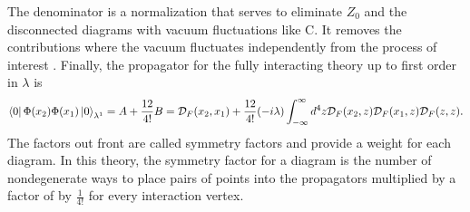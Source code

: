 \documentclass[12pt]{article}
\begin{document}
The denominator is a normalization that serves to eliminate $Z_0$ and the disconnected diagrams with vacuum fluctuations like C. It removes the contributions where the vacuum fluctuates independently from the process of interest \cite{peskin}. Finally, the propagator for the fully interacting theory up to first order in $\lambda$ is 
\begin{equation}
\bra{0}\Phi(x_2)\Phi(x_1)\ket{0}_{\lambda^1} = A + \frac{12}{4!}B = \mathcal{D}_F(x_2,x_1) + 
\frac{12}{4!}(-i\lambda)\int_{-\infty}^{\infty} d^4z \mathcal{D}_F(x_2,z) \mathcal{D}_F(x_1,z) \mathcal{D}_F(z,z).
\end{equation}
The factors out front are called symmetry factors and provide a weight for each diagram. In this theory, the symmetry factor for a diagram is the number of nondegenerate ways to place pairs of points into the propagators multiplied by a factor of by $\frac{1}{4!}$ for every interaction vertex. 
\end{document}
